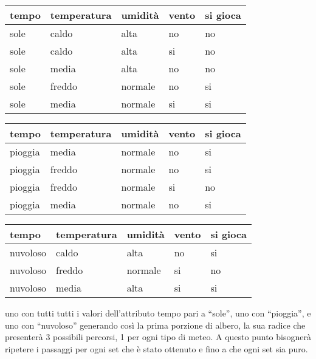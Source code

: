 \begin{center}
	\begin{tabular}{@{}|l|l|l|l|l|@{}}
		\toprule
		tempo	 & temperatura & umidità & vento & si gioca\\ \midrule
		sole     & caldo  & alta    & no & no \\ \midrule
		sole     & caldo  & alta    & si & no \\ \midrule
		sole     & media  & alta    & no & no \\ \midrule
		sole     & freddo & normale & no & si \\ \midrule
		sole     & media  & normale & si & si \\ \bottomrule
	\end{tabular}
	
	\begin{tabular}{@{}|l|l|l|l|l|@{}}
		\toprule
		tempo	 & temperatura & umidità & vento & si gioca\\ \midrule
		pioggia  & media  & normale & no & si \\ \midrule
		pioggia  & freddo & normale & no & si \\ \midrule
		pioggia  & freddo & normale & si & no \\ \midrule
		pioggia  & media  & normale & no & si \\ \bottomrule
	\end{tabular}

	\begin{tabular}{@{}|l|l|l|l|l|@{}}
		\toprule
		tempo	 & temperatura & umidità & vento & si gioca\\ \midrule
		nuvoloso & caldo  & alta    & no & si \\ \midrule
		nuvoloso & freddo & normale & si & no \\ \midrule
		nuvoloso & media  & alta    & si & si \\ \bottomrule
	\end{tabular}

\end{center}

uno con tutti tutti i valori dell'attributo tempo pari a ``sole'', uno con ``pioggia'', e uno con ``nuvoloso'' generando così la prima porzione di albero, la sua radice che presenterà 3 possibili percorsi, 1 per ogni tipo di meteo. A questo punto bisognerà ripetere i passaggi per ogni set che è stato ottenuto e fino a che ogni set sia puro.


